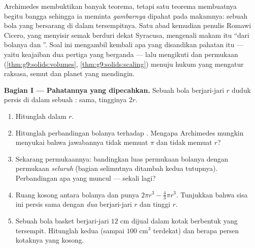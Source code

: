 \begin{problem}
\label{pb:g9:solids:1}
Archimedes membuktikan banyak teorema, tetapi satu teorema membuatnya
begitu bangga sehingga ia meminta \emph{gambarnya} dipahat pada
makamnya: sebuah bola yang bersarang di dalam  tersempitnya. Satu
abad kemudian penulis Romawi Cicero, yang menyisir semak berduri dekat
Syracusa, mengenali makam itu ``dari bolanya dan ''. Soal ini
mengambil kembali apa yang disandikan pahatan itu --- yaitu keajaiban
dua pertiga yang berganda --- lalu mengikuti  dan permukaan
(\cref{thm:g9:solids:volumes},
\cref{thm:g9:solids:scaling}) menuju hukum yang mengatur raksasa, semut
dan planet yang mendingin.

\medskip
\noindent\textbf{Bagian I --- Pahatannya yang dipecahkan.}
Sebuah bola berjari-jari $r$ duduk persis di dalam sebuah :
 sama, tingginya $2r$.
\begin{enumerate}
  \item Hitunglah   dalam $r$.
  \item Hitunglah perbandingan  bolanya terhadap 
        . Mengapa Archimedes mungkin menyukai bahwa
        jawabannya tidak memuat $\pi$ dan tidak memuat $r$?
  \item Sekarang permukaannya: bandingkan luas permukaan bolanya
        dengan permukaan \emph{seluruh}  (bagian selimutnya
        ditambah kedua tutupnya). Perbandingan apa yang muncul ---
        sekali lagi?
  \item Ruang kosong antara bolanya dan  punya 
        $2\pi r^3 - \frac43\pi r^3$. Tunjukkan bahwa sisa ini
        persis sama dengan  \emph{dua } berjari-jari
        $r$ dan tinggi $r$.
  \item Sebuah bola basket berjari-jari $12$ cm dijual dalam kotak
        berbentuk  yang tersempit. Hitunglah kedua 
        (sampai $100$ cm$^3$ terdekat) dan berapa persen kotaknya
        yang kosong.
\end{enumerate}


\end{problem}
